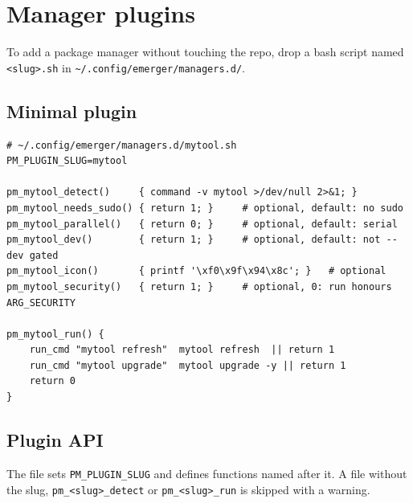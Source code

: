 \documentclass[11pt,a4paper]{article}
\begin{document}
\section{Manager plugins}\label{sec:plugins}

To add a package manager without touching the repo, drop a bash script
named \texttt{<slug>.sh} in \verb|~/.config/emerger/managers.d/|.

\subsection{Minimal plugin}

\begin{lstlisting}[language=bashplus]
# ~/.config/emerger/managers.d/mytool.sh
PM_PLUGIN_SLUG=mytool

pm_mytool_detect()     { command -v mytool >/dev/null 2>&1; }
pm_mytool_needs_sudo() { return 1; }     # optional, default: no sudo
pm_mytool_parallel()   { return 0; }     # optional, default: serial
pm_mytool_dev()        { return 1; }     # optional, default: not --dev gated
pm_mytool_icon()       { printf '\xf0\x9f\x94\x8c'; }   # optional
pm_mytool_security()   { return 1; }     # optional, 0: run honours ARG_SECURITY

pm_mytool_run() {
    run_cmd "mytool refresh"  mytool refresh  || return 1
    run_cmd "mytool upgrade"  mytool upgrade -y || return 1
    return 0
}
\end{lstlisting}

\subsection{Plugin API}
The file sets \verb|PM_PLUGIN_SLUG| and defines functions named after
it. A file without the slug, \verb|pm_<slug>_detect| or
\verb|pm_<slug>_run| is skipped with a warning.
\end{document}
